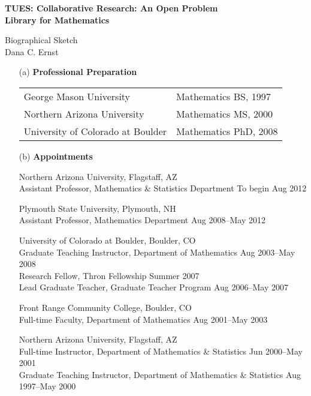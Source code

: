 \documentclass[11pt]{article}
\begin{document}
\begin{center}
{\Large \textbf{TUES: Collaborative Research: An Open Problem\\
Library for Mathematics}}

\bigskip

{\Large Biographical Sketch}\\
\smallskip
Dana C. Ernst
\end{center}

\begin{enumerate}[leftmargin=*]

\item[(a)] \textbf{Professional Preparation}

\begin{tabularx}{6.4in}{@{}XX}
George Mason University  & Mathematics \hfill BS, 1997\\
Northern Arizona University & Mathematics \hfill MS, 2000\\
University of Colorado at Boulder & Mathematics \hfill PhD, 2008
\end{tabularx}

\item[(b)] \textbf{Appointments}

Northern Arizona University, Flagstaff, AZ\\
Assistant Professor, Mathematics \& Statistics Department  \hfill To begin Aug 2012

\smallskip

Plymouth State University, Plymouth, NH\\
Assistant Professor, Mathematics Department  \hfill Aug 2008--May 2012

\smallskip

University of Colorado at Boulder, Boulder, CO\\  
Graduate Teaching Instructor, Department of Mathematics  \hfill Aug 2003--May 2008\\
Research Fellow, Thron Fellowship \hfill Summer 2007\\
Lead Graduate Teacher, Graduate Teacher Program \hfill Aug 2006--May 2007

\smallskip

Front Range Community College, Boulder, CO\\
Full-time Faculty, Department of Mathematics \hfill Aug 2001--May 2003

\smallskip

Northern Arizona University, Flagstaff, AZ\\
Full-time Instructor, Department of Mathematics \& Statistics \hfill Jun 2000--May 2001\\
Graduate Teaching Instructor, Department of Mathematics \& Statistics \hfill Aug 1997--May 2000


\end{enumerate}
\end{document}
